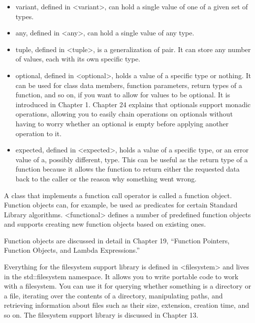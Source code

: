 \begin{itemize}
\item
variant, defined in <variant>, can hold a single value of one of a given set of types.

\item
any, defined in <any>, can hold a single value of any type.

\item
tuple, defined in <tuple>, is a generalization of pair. It can store any number of values, each with its own specific type.

\item
optional, defined in <optional>, holds a value of a specific type or nothing. It can be used for class data members, function parameters, return types of a function, and so on, if you want to allow for values to be optional. It is introduced in Chapter 1. Chapter 24 explains that optionals support monadic operations, allowing you to easily chain operations on optionals without having to worry whether an optional is empty before applying another operation to it.


\item
expected, defined in <expected>, holds a value of a specific type, or an error value of a, possibly different, type. This can be useful as the return type of a function because it allows the function to return either the requested data back to the caller or the reason why something went wrong.
\end{itemize}


A class that implements a function call operator is called a function object. Function objects can, for example, be used as predicates for certain Standard Library algorithms. <functional> defines a number of predefined function objects and supports creating new function objects based on existing ones.

Function objects are discussed in detail in Chapter 19, “Function Pointers, Function Objects, and Lambda Expressions.”


Everything for the filesystem support library is defined in <filesystem> and lives in the std::filesystem namespace. It allows you to write portable code to work with a filesystem. You can use it for querying whether something is a directory or a file, iterating over the contents of a directory, manipulating paths, and retrieving information about files such as their size, extension, creation time, and so on. The filesystem support library is discussed in Chapter 13.

